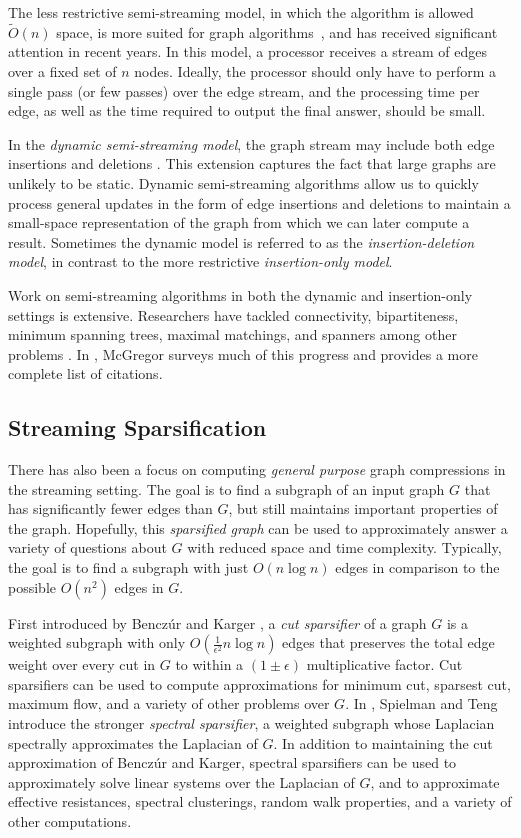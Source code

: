 \documentclass[11pt]{article}
\begin{document}
The less restrictive semi-streaming model, in which the
algorithm is allowed $\tilde O(n)$ space, is more suited for graph
algorithms~\cite{feigenbaum2005graph}, and has received significant attention in recent years. In this model, a processor receives a stream of edges over a fixed set of $n$ nodes.  Ideally, the processor should only have to perform a single pass (or few passes) over the edge stream, and the processing time per edge, as well as the time required to output the final answer, should be small.

In the \emph{dynamic semi-streaming model}, the graph stream may include both edge insertions and deletions \cite{linearMeasurement}. This extension captures the fact that large graphs are unlikely to be static. Dynamic semi-streaming algorithms allow us to quickly process general updates in the form of edge insertions and deletions to maintain a small-space representation of the graph from which we can later compute a result. Sometimes the dynamic model is referred to as the \emph{insertion-deletion model}, in contrast to the more restrictive \emph{insertion-only model}.

Work on semi-streaming algorithms in both the dynamic and insertion-only settings is extensive. Researchers have tackled connectivity, bipartiteness, minimum spanning trees, maximal matchings, and spanners among other problems \cite{feigenbaum2005graph, epstein2011improved, elkin2011streaming, linearMeasurement,gssss}. In \cite{gregorSurvey},  McGregor surveys much of this progress and provides a more complete list of citations.

\subsection{Streaming Sparsification}
There has also been a focus on computing \emph{general purpose} graph compressions in the streaming setting. The goal is to find a subgraph of an input graph $G$ that has significantly fewer edges than $G$, but still maintains important properties of the graph. Hopefully, this \emph{sparsified graph} can be used to approximately answer a variety of questions about $G$ with reduced space and time complexity. Typically, the goal is to find a subgraph with just $O(n \log n)$ edges in comparison to the possible $O(n^2)$ edges in $G$. 

First introduced by Bencz{\'u}r and Karger \cite{benczur1996approximating}, a \emph{cut sparsifier} of a graph $G$ is a weighted subgraph with only $O(\frac{1}{\epsilon^2}n\log n)$ edges that preserves the total edge weight over every cut in $G$ to within a $(1 \pm \epsilon)$ multiplicative factor. Cut sparsifiers can be used to compute approximations for minimum cut, sparsest cut, maximum flow, and a variety of other problems over $G$. In \cite{spielmanTengSpectralSparse}, Spielman and Teng introduce the stronger \emph{spectral sparsifier}, a weighted subgraph whose Laplacian spectrally approximates the Laplacian of $G$. In addition to maintaining the cut approximation of Bencz{\'u}r and Karger, spectral sparsifiers can be used to approximately solve linear systems over the Laplacian of $G$, and to approximate effective resistances, spectral clusterings, random walk properties, and a variety of other computations. 
\end{document}
